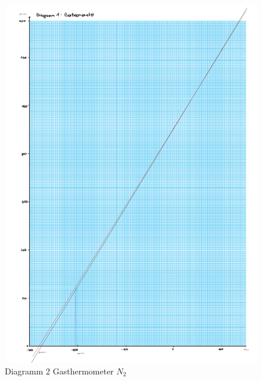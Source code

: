 \begin{figure}[h!]
    \centering
    \includegraphics[page=2, width=.95\textwidth,]{41Dias.pdf}
    \caption{Diagramm 2 Gasthermometer $N_2$}
\end{figure}
\newpage
